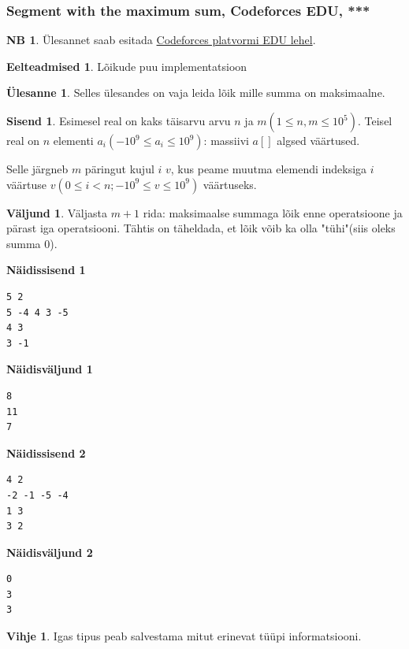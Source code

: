 \documentclass{trkut}
\theoremstyle{definition}
\newtheorem*{prereq}{Eelteadmised}
\newtheorem*{extra}{NB}
\newtheorem*{vihje}{Vihje}
\newtheorem*{Input}{Sisend}
\newtheorem*{Output}{Väljund}
\newtheorem*{Text}{Ülesanne}
\begin{document}
\subsubsection{Segment with the maximum sum, Codeforces EDU,  ***}
\begin{extra}
Ülesannet saab esitada \href{https://codeforces.com/edu/course/2/lesson/4/2/practice/contest/273278/problem/A}{Codeforces platvormi EDU lehel}.
\end{extra}
\begin{prereq}
Lõikude puu implementatsioon
\end{prereq}
\begin{Text}
Selles ülesandes on vaja leida lõik mille summa on maksimaalne.

\parencite{9}
\end{Text}
\begin{Input}
Esimesel real on kaks täisarvu arvu $n$ ja $m$$(1\le n, m\le 10^5)$.
Teisel real on $n$ elementi $a_i$$(-10^9\le a_i\le 10^9)$: massiivi $a[]$ algsed väärtused.

Selle järgneb $m$ päringut kujul $i$ $v$, kus peame muutma elemendi indeksiga $i$ väärtuse $v$$(0\le i<n;-10^9\le v\le 10^9)$ väärtuseks.
\end{Input}
\begin{Output}
Väljasta $m+1$ rida: maksimaalse summaga lõik enne operatsioone ja pärast iga operatsiooni. Tähtis on täheldada, et lõik võib ka olla "tühi"(siis oleks summa 0).
\end{Output}

\textbf{Näidissisend 1}

\begin{verbatim}
5 2
5 -4 4 3 -5
4 3
3 -1
\end{verbatim}

\textbf{Näidisväljund 1}

\begin{verbatim}
8
11
7
\end{verbatim}



\textbf{Näidissisend 2}

\begin{verbatim}
4 2
-2 -1 -5 -4
1 3
3 2
\end{verbatim}

\textbf{Näidisväljund 2}

\begin{verbatim}
0
3
3
\end{verbatim}


\begin{vihje}
Igas tipus peab salvestama mitut erinevat tüüpi informatsiooni.
\end{vihje}
\end{document}
